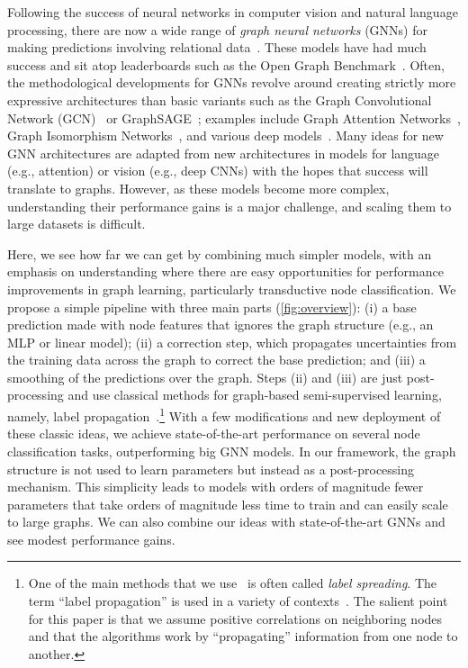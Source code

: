 \documentclass{article}
\begin{document}
Following the success of neural networks in computer vision and natural language processing,
there are now a wide range of \emph{graph neural networks} (GNNs) for making predictions involving relational data~\citep{Battaglia2018RelationalIB,Wu2020ACS}.
These models have had much success and sit atop leaderboards such as the Open Graph Benchmark~\citep{Hu2020OpenGB}.
Often, the methodological developments for GNNs revolve around creating strictly more expressive architectures
than basic variants such as the Graph Convolutional Network (GCN)~\citep{kipf2017semi} or GraphSAGE~\citep{hamilton2017inductive};
examples include
Graph Attention Networks~\citep{velickovic2018graph},
Graph Isomorphism Networks~\citep{xu2018powerful},
and various deep models~\citep{li2019deepgcns,rong2019dropedge,chen2020simple}.
Many ideas for new GNN architectures are adapted from new architectures in models for language (e.g., attention) or vision (e.g., deep CNNs)
with the hopes that success will translate to graphs.
However, as these models become more complex, 
understanding their performance gains is a major challenge, and
scaling them to large datasets is difficult.

Here, we see how far we can get by combining much simpler models,
with an emphasis on understanding where there are easy opportunities for performance improvements in graph learning, particularly transductive node classification.
We propose a simple pipeline with three main parts (\cref{fig:overview}):
(i) a base prediction made with node features that ignores the graph structure (e.g., an MLP or linear model);
(ii) a correction step, which propagates uncertainties from the training data across the graph to correct the base prediction; and
(iii) a smoothing of the predictions over the graph.
Steps (ii) and (iii) are just post-processing
and use classical methods for graph-based semi-supervised learning, namely, label propagation~\citep{zhu2005semi}.\footnote{One of the main methods that we use~\citep{zhou2004learning} is often called \emph{label spreading}.
The term ``label propagation'' is used in a variety of contexts~\citep{zhu2005semi,wang2007label,raghavan2007near,gleich2015using}.
The salient point for this paper is that we assume positive correlations on neighboring nodes and that the algorithms work by
``propagating'' information from one node to another.}
With a few modifications and new deployment of these classic ideas, 
we achieve state-of-the-art performance on several node classification tasks,
outperforming big GNN models. 
In our framework, the graph structure is not used to learn parameters but instead as a post-processing mechanism.
This simplicity leads to models with orders of magnitude fewer parameters that take orders of magnitude less time to train
and can easily scale to large graphs.
We can also combine our ideas with state-of-the-art GNNs and see modest performance gains.
\end{document}
